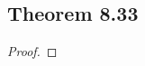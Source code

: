 \documentclass[../../main.tex]{subfiles}
\begin{document}
\subsection{Theorem 8.33}
\begin{wts}

\end{wts}
\begin{proof}

\end{proof}
\end{document}
